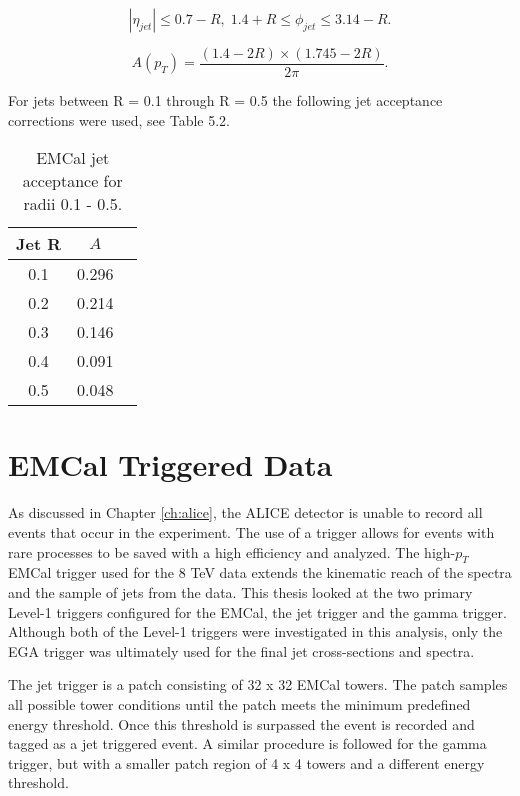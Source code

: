 \begin{equation}
|\eta_{jet}| \leq 0.7 - R, \; 1.4 + R \leq \phi_{jet} \leq 3.14 -R.
\label{eq:jetconstration}
\end{equation}

\begin{equation}
A(p_{T}) = \frac{(1.4 - 2R) \times (1.745 - 2R)}{2 \pi}.
\label{eq:acceptance}
\end{equation}

For jets between R = 0.1 through R = 0.5 the following jet acceptance corrections were used, see Table 5.2.

\begin{table}[hb]
\label{tab:AcceptanceFactor}
\begin{center}
\caption{EMCal jet acceptance for radii 0.1 - 0.5.}
\begin{tabular}[b]{|c|c|c|}
	\hline
	Jet R & $ A $ \\ \hline
	0.1 & 0.296 \\ \hline
	0.2 & 0.214\\ \hline
	0.3 & 0.146\\ \hline
	0.4 & 0.091\\ \hline
	0.5 & 0.048\\ \hline
\end{tabular}
\end{center}

\end{table}

\section{EMCal Triggered Data}

As discussed in Chapter \ref{ch:alice}, the ALICE detector is unable to record all events that occur in the experiment.   The use of a trigger allows for events with rare processes to be saved with a high efficiency and analyzed.  The high-$p_{T}$ EMCal trigger used for the 8 TeV data extends the kinematic reach of the spectra and the sample of jets from the data.  This thesis looked at the two primary Level-1 triggers configured for the EMCal, the jet trigger and the gamma trigger\cite{Bourrion:2010js}.  Although both of the Level-1 triggers were investigated in this analysis, only the EGA trigger was ultimately used for the final jet cross-sections and spectra.  

The jet trigger is a patch consisting of 32 x 32 EMCal towers.  The patch samples all possible tower conditions until the patch meets the minimum predefined energy threshold.  Once this threshold is surpassed the event is recorded and tagged as a jet triggered event.  A similar procedure is followed for the gamma trigger, but with a smaller patch region of 4 x 4 towers and a different energy threshold.  

